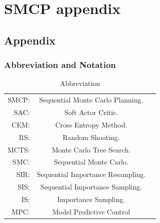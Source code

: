 \chapter{SMCP appendix}
\section{Appendix}
\label{sec:appendix}

\subsection{Abbreviation and Notation}
\label{app:notation}
\begin{table}[H]\caption{Abbreviation}
\begin{center}%
\begin{tabular}{r c p{10cm} }
\toprule
SMCP: & Sequential Monte Carlo Planning.\\
SAC: & Soft Actor Critic.\\
CEM: & Cross Entropy Method.\\
RS: & Random Shooting.\\
MCTS: & Monte Carlo Tree Search.\\
SMC: & Sequential Monte Carlo.\\
SIR: & Sequential Importance Resampling.\\
SIS: & Sequential Importance Sampling.\\
IS: & Importance Sampling.\\
MPC: & Model Predictive Control\\
\bottomrule
\end{tabular}
\end{center}
\label{tab:abbreviation}
\end{table}


